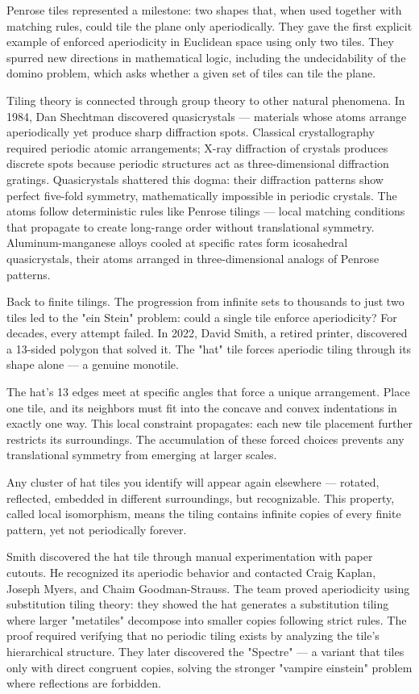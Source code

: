 Penrose tiles represented a milestone: two shapes that, when used together with matching rules, could tile the plane only aperiodically. They gave the first explicit example of enforced aperiodicity in Euclidean space using only two tiles. They spurred new directions in mathematical logic, including the undecidability of the domino problem, which asks whether a given set of tiles can tile the plane.

Tiling theory is connected through group theory to other natural phenomena. In 1984, Dan Shechtman discovered quasicrystals — materials whose atoms arrange aperiodically yet produce sharp diffraction spots. Classical crystallography required periodic atomic arrangements; X-ray diffraction of crystals produces discrete spots because periodic structures act as three-dimensional diffraction gratings. Quasicrystals shattered this dogma: their diffraction patterns show perfect five-fold symmetry, mathematically impossible in periodic crystals. The atoms follow deterministic rules like Penrose tilings — local matching conditions that propagate to create long-range order without translational symmetry. Aluminum-manganese alloys cooled at specific rates form icosahedral quasicrystals, their atoms arranged in three-dimensional analogs of Penrose patterns.

Back to finite tilings. The progression from infinite sets to thousands to just two tiles led to the "ein Stein" problem: could a single tile enforce aperiodicity? For decades, every attempt failed. In 2022, David Smith, a retired printer, discovered a 13-sided polygon that solved it. The "hat" tile forces aperiodic tiling through its shape alone — a genuine monotile.

The hat's 13 edges meet at specific angles that force a unique arrangement. Place one tile, and its neighbors must fit into the concave and convex indentations in exactly one way. This local constraint propagates: each new tile placement further restricts its surroundings. The accumulation of these forced choices prevents any translational symmetry from emerging at larger scales.

Any cluster of hat tiles you identify will appear again elsewhere — rotated, reflected, embedded in different surroundings, but recognizable. This property, called local isomorphism, means the tiling contains infinite copies of every finite pattern, yet not periodically forever.

Smith discovered the hat tile through manual experimentation with paper cutouts. He recognized its aperiodic behavior and contacted Craig Kaplan, Joseph Myers, and Chaim Goodman-Strauss. The team proved aperiodicity using substitution tiling theory: they showed the hat generates a substitution tiling where larger "metatiles" decompose into smaller copies following strict rules. The proof required verifying that no periodic tiling exists by analyzing the tile's hierarchical structure. They later discovered the "Spectre" — a variant that tiles only with direct congruent copies, solving the stronger "vampire einstein" problem where reflections are forbidden.

